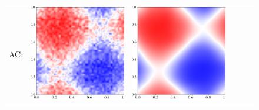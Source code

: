 \documentclass[12pt, reqno]{report}
\theoremstyle{definition}
\theoremstyle{remark}
\begin{document}
\begin{figure}[H]
\begin{tabular}{rccccc}
        AC: &
        \includegraphics[align = c, height=\subheight]{media_paper/AC_cmap_FD_n=0.png} & 
        \includegraphics[align = c, height=\subheight]{media_paper/AC_cmap_FD_n=50.png} & 

\end{tabular}
\end{figure}
\end{document}
